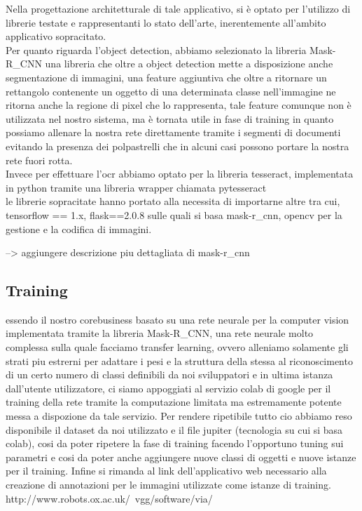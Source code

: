 \documentclass[12pt,a4paper]{article}
\begin{document}
Nella progettazione architetturale di tale applicativo, si è optato per
l'utilizzo di librerie testate e rappresentanti lo stato dell'arte, inerentemente all'ambito applicativo sopracitato.\\
Per quanto riguarda l'object detection, abbiamo selezionato la libreria Mask-R_CNN
una libreria che oltre a object detection mette a disposizione anche segmentazione di immagini,
una feature aggiuntiva che oltre a ritornare un rettangolo contenente un oggetto di una determinata classe nell'immagine ne
ritorna anche la regione di pixel che lo rappresenta, tale feature comunque non è utilizzata nel nostro sistema,
ma è tornata utile in fase di training in quanto possiamo allenare la nostra rete direttamente tramite i segmenti di documenti evitando
la presenza dei polpastrelli che in alcuni casi possono portare la nostra rete fuori rotta.\\
Invece per effettuare l'ocr abbiamo optato per la libreria tesseract, implementata in python tramite una libreria wrapper chiamata pytesseract\\

le librerie sopracitate hanno portato alla necessita di importarne altre tra cui, tensorflow == 1.x,
flask==2.0.8 sulle quali si basa mask-r_cnn, opencv per la gestione e la codifica di immagini.

--> aggiungere descrizione piu dettagliata di mask-r_cnn

\subsection{Training}

essendo il nostro corebusiness basato su una rete neurale per la computer vision implementata tramite la libreria Mask-R_CNN, 
una rete neurale molto complessa sulla quale facciamo transfer learning, ovvero alleniamo solamente gli strati piu estrerni per adattare i pesi e la struttura
della stessa al riconoscimento di un certo numero di classi definibili da noi sviluppatori e in ultima istanza dall'utente utilizzatore, ci siamo appoggiati
al servizio colab di google per il training della rete tramite la computazione limitata ma estremamente potente messa 
a dispozione da tale servizio.
Per rendere ripetibile tutto cio abbiamo reso disponibile il dataset da noi utilizzato e il file jupiter (tecnologia su cui si basa colab),
cosi da poter ripetere la fase di training facendo l'opportuno tuning sui parametri e cosi da poter anche aggiungere nuove classi di oggetti e nuove istanze per il training.
Infine si rimanda al link dell'applicativo web necessario alla creazione di annotazioni per le immagini utilizzate come istanze di training.
http://www.robots.ox.ac.uk/~vgg/software/via/ \\
\end{document}
